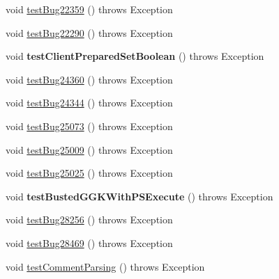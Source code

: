 \begin{DoxyCompactItemize}
void \mbox{\hyperlink{classtestsuite_1_1regression_1_1_statement_regression_test_a0e9ad9980acf6229f9b41dff9972e1c5}{test\+Bug22359}} ()  throws Exception 
\item 
void \mbox{\hyperlink{classtestsuite_1_1regression_1_1_statement_regression_test_ae2acdb736d0a4481a43f894bd9f40499}{test\+Bug22290}} ()  throws Exception 
\item 
\mbox{\label{classtestsuite_1_1regression_1_1_statement_regression_test_ac16a79beb37a6d25b917a295dae9828d}} 
void {\bfseries test\+Client\+Prepared\+Set\+Boolean} ()  throws Exception 
\item 
void \mbox{\hyperlink{classtestsuite_1_1regression_1_1_statement_regression_test_a3334c82a4ef7ac982bf6eca6fc081027}{test\+Bug24360}} ()  throws Exception 
\item 
void \mbox{\hyperlink{classtestsuite_1_1regression_1_1_statement_regression_test_a4da675927e9f55846b0ea0781c439c48}{test\+Bug24344}} ()  throws Exception 
\item 
void \mbox{\hyperlink{classtestsuite_1_1regression_1_1_statement_regression_test_a67cdc2b43a1d7ac490ee30dd639ebd48}{test\+Bug25073}} ()  throws Exception 
\item 
void \mbox{\hyperlink{classtestsuite_1_1regression_1_1_statement_regression_test_a857b7ade8c7c4e47bd7f0c8340d91386}{test\+Bug25009}} ()  throws Exception 
\item 
void \mbox{\hyperlink{classtestsuite_1_1regression_1_1_statement_regression_test_ae15552bf551f9a8b5b291264142f57ae}{test\+Bug25025}} ()  throws Exception 
\item 
\mbox{\label{classtestsuite_1_1regression_1_1_statement_regression_test_a4f411a83be8c28b4a75b6292e50e00d7}} 
void {\bfseries test\+Busted\+G\+G\+K\+With\+P\+S\+Execute} ()  throws Exception 
\item 
void \mbox{\hyperlink{classtestsuite_1_1regression_1_1_statement_regression_test_a45f6666d2a8fbbc59bb210cd6e6f33a5}{test\+Bug28256}} ()  throws Exception 
\item 
void \mbox{\hyperlink{classtestsuite_1_1regression_1_1_statement_regression_test_aa43369797070b07cf82bd806ef218255}{test\+Bug28469}} ()  throws Exception 
\item 
void \mbox{\hyperlink{classtestsuite_1_1regression_1_1_statement_regression_test_a21dd6e188a7b72c29bcab2bbd7cabbeb}{test\+Comment\+Parsing}} ()  throws Exception 

\end{DoxyCompactItemize}
